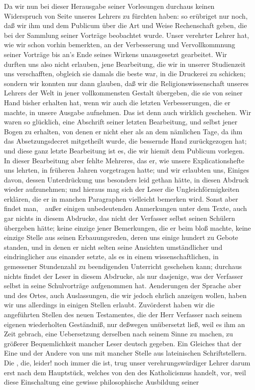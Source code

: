 Da wir nun bei dieser Herausgabe seiner Vorlesungen durchaus keinen Widerspruch von Seite unseres Lehrers zu fürchten haben: so erübriget nur noch, daß wir ihm und dem Publicum über die Art und Weise Rechenschaft geben, die bei der Sammlung seiner Vorträge beobachtet wurde. Unser verehrter Lehrer hat, wie wir schon vorhin bemerkten, an der Verbesserung und Vervollkommnung seiner Vorträge bis an's Ende seines Wirkens unausgesetzt gearbeitet. Wir durften uns also nicht erlauben, jene Bearbeitung, die wir in unserer Studienzeit uns verschafften, obgleich sie damals die beste war, in die Druckerei zu schicken; sondern wir konnten nur dann glauben, daß wir die Religionswissenschaft unseres Lehrers der Welt in jener vollkommensten Gestalt übergeben, die sie von seiner Hand bisher erhalten hat, wenn wir auch die letzten Verbesserungen, die er machte, in unsere Ausgabe aufnehmen. Das ist denn auch wirklich geschehen. Wir waren so glücklich, eine Abschrift seiner letzten Bearbeitung, und selbst jener Bogen zu erhalten, von denen er nicht eher als an dem nämlichen Tage, da ihm das Absetzungsdecret mitgetheilt wurde, die bessernde Hand zurückgezogen hat; und diese ganz letzte Bearbeitung ist es, die wir hiemit dem Publicum vorlegen. In dieser Bearbeitung aber fehlte Mehreres, das er, wie unsere Explicationshefte uns lehrten, in früheren Jahren vorgetragen hatte; und wir erlaubten uns, Einiges davon, dessen Unterdrückung uns besonders leid gethan hätte, in diesen Abdruck wieder aufzunehmen; und hieraus mag sich der Leser die Ungleichförmigkeiten erklären, die er in manchen Paragraphen vielleicht bemerken wird. Sonst aber findet man,~\ außer einigen unbedeutenden Anmerkungen unter dem Texte, auch gar nichts in diesem Abdrucke, das nicht der Verfasser selbst seinen Schülern  übergeben hätte; keine einzige jener Bemerkungen, die er beim  bloß  machte, keine einzige Stelle aus seinen Erbauungsreden, deren uns einige hundert zu Gebote standen, und in denen er nicht selten seine Ansichten umständlicher und eindringlicher aus einander setzte, als es in einem wissenschaftlichen, in gemessener Stundenzahl zu beendigenden Unterricht geschehen kann; durchaus nichts findet der Leser in diesem Abdrucke, als nur dasjenige, was der Verfasser selbst in seine Schulvorträge aufgenommen hat. Aenderungen der Sprache aber und des Ortes, auch Auslassungen, die wir jedoch ehrlich anzeigen wollen, haben wir uns allerdings in einigen Stellen erlaubt. Zuvörderst haben wir die angeführten Stellen des neuen Testamentes, die der Herr Verfasser nach seinem eigenen wiederholten Geständniß, nur deßwegen unübersetzt ließ, weil es ihm an Zeit gebrach, eine Uebersetzung derselben nach seinem Sinne zu machen, zu größerer Bequemlichkeit mancher Leser deutsch gegeben. Ein Gleiches that der Eine und der Andere von uns mit mancher Stelle aus lateinischen Schriftstellern. Die , die, leider! noch immer die  ist, trug unser verehrungswürdiger Lehrer darum erst nach dem Hauptstück, welches von den  des Katholicismus handelt, vor, weil diese Einschaltung eine gewisse philosophische Ausbildung seiner 